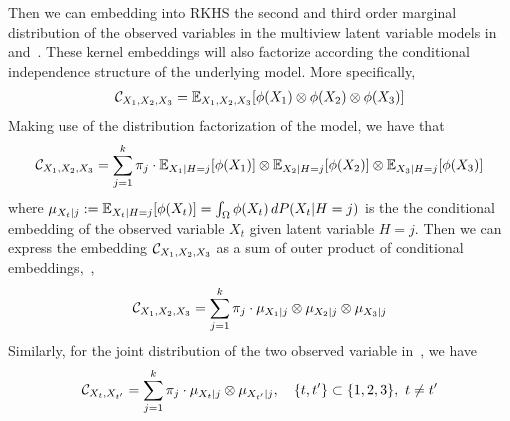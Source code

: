\documentclass[11pt]{article}
\begin{document}
Then we can embedding into RKHS the second and third order marginal distribution of the observed variables in the multiview latent variable models in~ and~. These kernel embeddings will also factorize according the conditional independence structure of the underlying model. More specifically,
\begin{align*}
  \mathcal{C}_{X_1,X_2,X_3}
  = \mathbb{E}_{X_1,X_2,X_3}[\phi(X_1)\otimes \phi(X_2) \otimes \phi(X_3)]
\end{align*}
Making use of the distribution factorization of the model, we have that
\begin{align*}
  \mathcal{C}_{X_1,X_2,X_3} =
  \sum_{j=1}^k \pi_j \cdot \mathbb{E}_{X_1| H=j}[\phi(X_1)]\otimes \mathbb{E}_{X_2|H=j} [\phi(X_2)] \otimes \mathbb{E}_{X_3|H=j}[\phi(X_3)]
\end{align*}
where $\mu_{X_t|j}:=\mathbb{E}_{X_t| H=j}[\phi(X_t)] = \int_{\Omega} \phi(X_t)\, d P(X_t|H=j)$ is the
the conditional embedding of the observed variable $X_t$ given latent variable $H=j$.
Then we can express the embedding $\mathcal{C}_{X_1,X_2,X_3}$ as a sum of outer product of conditional embeddings,~\ie,
\begin{align*}
  \mathcal{C}_{X_1,X_2,X_3}
  = \sum_{j=1}^k \pi_j \cdot \mu_{X_1|j} \otimes \mu_{X_2|j} \otimes \mu_{X_3|j}
\end{align*}
Similarly, for the joint distribution of the two observed variable in~, we have
\begin{align*}
  \mathcal{C}_{X_t,X_{t'}}
  = \sum_{j=1}^k \pi_j \cdot \mu_{X_t|j} \otimes \mu_{X_{t'}|j},\quad \{t,t'\} \subset \{1,2,3\},\ t\neq t'
\end{align*}


\end{document}
